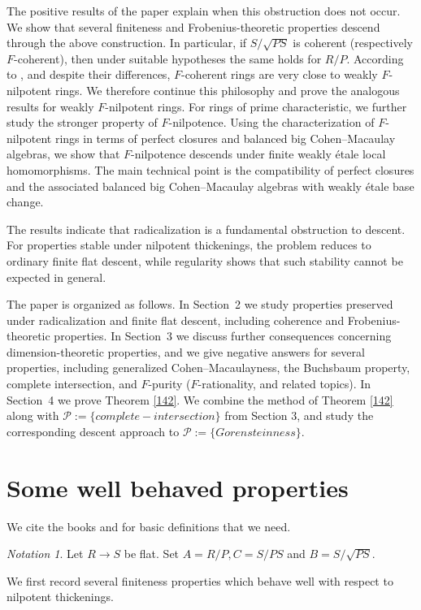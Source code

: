 \documentclass[10pt,a4paper]{amsart}
\theoremstyle{definition}
\theoremstyle{remark}
\newtheorem{notation}[theorem]{Notation}
\begin{document}
The positive results of the paper explain when this obstruction does
not occur. We show that several finiteness and Frobenius-theoretic
properties descend through the above construction. In particular, if
\(
S/\sqrt{PS}
\)
is coherent (respectively \(F\)-coherent), then under suitable
hypotheses the same holds for \(R/P\). According to \cite{A}, and despite their differences,
\(F\)-coherent rings are very close to weakly \(F\)-nilpotent rings.
We therefore continue this philosophy and prove the analogous results
for weakly \(F\)-nilpotent rings. For rings of prime characteristic, we further study the stronger
property of \(F\)-nilpotence. Using the characterization of
\(F\)-nilpotent rings in terms of perfect closures and balanced big
Cohen--Macaulay algebras, we show that \(F\)-nilpotence descends under
finite weakly étale local homomorphisms. The main technical point is
the compatibility of perfect closures and the associated balanced big
Cohen--Macaulay algebras with weakly étale base change.

The results indicate that radicalization is a fundamental obstruction
to descent. For properties stable under nilpotent thickenings, the
problem reduces to ordinary finite flat descent, while regularity shows
that such stability cannot be expected in general.

The paper is organized as follows. In Section~2 we study properties
preserved under radicalization and finite flat descent, including
coherence and Frobenius-theoretic properties. In Section~3 we discuss
further consequences concerning dimension-theoretic properties, and we give negative answers for several properties, including generalized Cohen--Macaulayness, the Buchsbaum property, complete intersection, and
\(F\)-purity (\(F\)-rationality, and related topics).
In
Section~4 we prove {Theorem} \ref{142}.  We combine the method of {Theorem} \ref{142} along with $\mathcal P:=\{complete-intersection\}$ from Section 3, and  study the corresponding descent approach to $\mathcal P:=\{Gorensteinness\}$.


 

\section{Some well behaved properties}
 We cite the books \cite{BH} and \cite{MP} for basic definitions that we need.
 \begin{notation}Let \(R\to S\) be flat. Set
 	$
 	A=R/P,  C=S/PS$ and
 	$B=S/\sqrt{PS}.
 	$ \end{notation}
 We first record several finiteness properties which behave well with respect to
 nilpotent thickenings.
 
\end{document}
